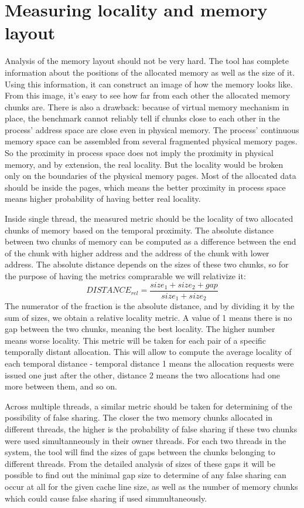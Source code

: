 \section{Measuring locality and memory layout}

Analysis of the memory layout should not be very hard. The tool has complete information about the positions of the allocated memory as well as the size of it. Using this information, it can construct an image of how the memory looks like. From this image, it's easy to see how far from each other the allocated memory chunks are. There is also a drawback: because of virtual memory mechanism in place, the benchmark cannot reliably tell if chunks close to each other in the process' address space are close even in physical memory. The process' continuous memory space can be assembled from several fragmented physical memory pages. So the proximity in process space does not imply the proximity in physical memory, and by extension, the real locality. But the locality would be broken only on the boundaries of the physical memory pages. Most of the allocated data should be inside the pages, which means the better proximity in process space means higher probability of having better real locality.

Inside single thread, the measured metric should be the locality of two allocated chunks of memory based on the temporal proximity. The absolute distance between two chunks of memory can be computed as a difference between the end of the chunk with higher address and the address of the chunk with lower address. The absolute distance depends on the sizes of these two chunks, so for the purpose of having the metrics comprarable we will relativize it:
\begin{displaymath}
DISTANCE_{rel} = \frac{size_1 + size_2 + gap}{size_1 + size_2}
\end{displaymath}
The numerator of the fraction is the absolute distance, and by dividing it by the sum of sizes, we obtain a relative locality metric. A value of 1 means there is no gap between the two chunks, meaning the best locality. The higher number means worse locality. This metric will be taken for each pair of a specific temporally distant allocation. This will allow to compute the average locality of each temporal distance - temporal distance 1 means the allocation requests were issued one just after the other, distance 2 means the two allocations had one more between them, and so on.

Across multiple threads, a similar metric should be taken for determining of the possibility of false sharing. The closer the two memory chunks allocated in different threads, the higher is the probability of false sharing if these two chunks were used simultanneously in their owner threads. For each two threads in the system, the tool will find the sizes of gaps between the chunks belonging to different threads. From the detailed analysis of sizes of these gaps it will be possible to find out the minimal gap size to determine of any false sharing can occur at all for the given cache line size, as well as the number of memory chunks which could cause false sharing if used simmultaneously.


